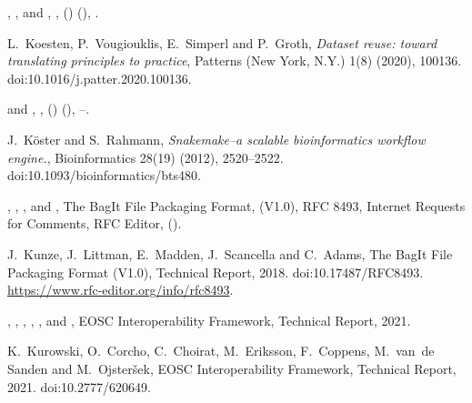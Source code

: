 \documentclass[ds,v1.1.2,openaccess]{iosart2x}%
\begin{document}
\begin{thebibliography}{}
%
\begin{barticle}
,
,
 and
,
,
()
(),
.
\end{barticle}
%
\OrigBibText
L.~Koesten,
P.~Vougiouklis,
E.~Simperl and
P.~Groth,
\textit{Dataset reuse: toward translating principles to practice},
Patterns (New York, N.Y.)
1(8)
(2020),
100136.
doi:10.1016/j.patter.2020.100136.
\endOrigBibText
{}
\endbibitem

%
\begin{barticle}
 and
,
,
()
(),
--.
\end{barticle}
%
\OrigBibText
J.~K\"{o}ster and
S.~Rahmann,
\textit{Snakemake--a scalable bioinformatics workflow engine.},
Bioinformatics
28(19)
(2012),
2520--2522.
doi:10.1093/bioinformatics/bts480.
\endOrigBibText
{}
\endbibitem

%
\begin{botherref}
,
,
,
 and
,
The {BagIt} File Packaging Format,
(V1.0), 
RFC 8493,
Internet Requests for Comments,
RFC Editor,
().
\end{botherref}
%
\OrigBibText
J.~Kunze,
J.~Littman,
E.~Madden,
J.~Scancella and
C.~Adams,
The {BagIt} File Packaging Format (V1.0),
Technical Report,
2018.
doi:10.17487/RFC8493.
\url{https://www.rfc-editor.org/info/rfc8493}.
\endOrigBibText
{}
\endbibitem

%
\begin{botherref}
,
,
,
,
,
 and
,
{EOSC} Interoperability Framework, Technical Report,
2021.
\end{botherref}
%
\OrigBibText
K.~Kurowski,
O.~Corcho,
C.~Choirat,
M.~Eriksson,
F.~Coppens,
M.~van~de Sanden and
M.~Ojster\v{s}ek,
{EOSC} Interoperability Framework,
Technical Report,
2021.
doi:10.2777/620649.
\endOrigBibText
{}
\endbibitem


\end{thebibliography}
\end{document}
